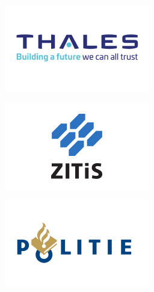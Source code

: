 \documentclass{beamer}
\begin{document}
\begin{frame}
{{\begin{minipage}{.15\textwidth}\includegraphics[width=\columnwidth]{../img/logo_thales.png}\end{minipage}%
\begin{minipage}{.15\textwidth}\includegraphics[width=\columnwidth]{../img/logo_zitis.png}\end{minipage}%
\begin{minipage}{.15\textwidth}\includegraphics[width=\columnwidth]{../img/logo_npn.png}\end{minipage}%

}}
\end{frame}
\end{document}
